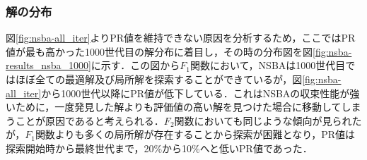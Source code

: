 \documentclass[a4j,11pt]{jarticle}
\begin{document}
\subsubsection{解の分布}
図\ref{fig:nsba-all_iter}よりPR値を維持できない原因を分析するため，ここではPR値が最も高かった1000世代目の解分布に着目し，その時の分布図を図\ref{fig:nsba-results_nsba_1000}に示す．この図から$F_1$関数において，NSBAは1000世代目ではほぼ全ての最適解及び局所解を探索することができているが，図\ref{fig:nsba-all_iter}から1000世代以降にPR値が低下している．これはNSBAの収束性能が強いために，一度発見した解よりも評価値の高い解を見つけた場合に移動してしまうことが原因であると考えられる．$F_2$関数においても同じような傾向が見られたが，$F_1$関数よりも多くの局所解が存在することから探索が困難となり，PR値は探索開始時から最終世代まで，20\%から10\%へと低いPR値であった．

\begin{figure}[t]
\centering
{}
\end{figure}
\end{document}
